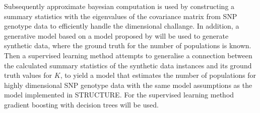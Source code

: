 \documentclass[a4paper, 11pt]{article}
\begin{document}
Subsequently approximate bayesian computation is used by constructing a summary statistics with the eigenvalues of the covariance matrix from SNP genotype data to efficiently handle the dimensional challange. In addition, a generative model based on a model proposed by \cite{pritchard2000inference, falush2003inference} will be used to generate synthetic data, where the ground truth for the number of populations is known. Then a supervised learning method attempts to generalise a connection between the calculated summary statistics of the synthetic data instances and its ground truth values for $K$, to yield a model that estimates the number of populations for highly dimensional SNP genotype data with the same model assumptions as the model implemented in STRUCTURE. For the supervised learning method gradient boosting with decision trees will be used.
\end{document}
